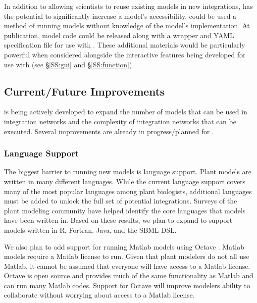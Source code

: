 \documentclass[journal]{IEEEtran}
\newcommand{\todo}[1]{{\color{red}{#1}}}
\newcommand{\pkg}{{\tt \todo{cis\_interface}}{}}
\begin{document}
In addition to allowing scientists to reuse existing models in new integrations, {\pkg} has the potential to significantly increase a model's accessibility. {\pkg} could be used a method of running models without knowledge of the model's implementation. At publication, model code could be released along with a wrapper and YAML specification file for use with {\pkg}. These additional materials would be particularly powerful when considered alongside the interactive features being developed for use with {\pkg} (see \S\ref{SS:gui} and \S\ref{SS:function}).

\subsection{Current/Future Improvements}\label{SS:future}
%
{\pkg} is being actively developed to expand the number of models 
that can be used in integration networks and the complexity of integration 
networks that can be executed. Several improvements are already in progress/planned for {\pkg}.

\subsubsection{Language Support}\label{SS:langsupport}
%
The biggest barrier to running new models is language support. Plant models 
are written in many different languages. While the current language support 
covers many of the most popular languages among plant biologists, 
additional languages must be added to unlock the full set of potential integrations. 
Surveys of the plant modeling community have helped identify the core languages 
that models have been written in. Based on these results, we plan to expand 
{\pkg} to support models written in R, Fortran, Java, and the SBML \citep{Hucka2003} DSL.

We also plan to add support for running Matlab models using Octave \citep{Eaton2002}. Matlab 
models require a Matlab license to run. Given that plant modelers do not all 
use Matlab, it cannot be assumed that everyone will have access to a Matlab 
license. Octave is open source and provides much of the same functionality 
as Matlab and can run many Matlab codes. Support for Octave will improve 
modelers ability to collaborate without worrying about access to a Matlab 
license. 

\end{document}
